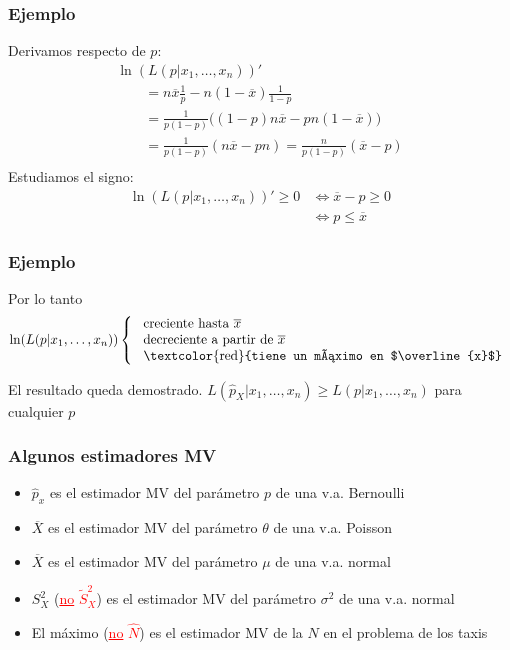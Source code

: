 \documentclass[12pt,t]{beamer}
\newcommand{\red}[1]{\textcolor{red}{#1}}
\renewcommand{\leq}{\leqslant}
\renewcommand{\geq}{\geqslant}
\theoremstyle{plain}
\theoremstyle{definition}
\begin{document}
\begin{frame}
\frametitle{Ejemplo}
Derivamos respecto de $p$:
$$
\begin{array}{l}
\ln(L(p|x_1,\ldots,x_n))'\\
\qquad \displaystyle=n\overline{x}\frac{1}{p}-n(1-\overline{x})\frac{1}{1-p}\\
\qquad \displaystyle=\frac{1}{p(1-p)}\Big((1-p)n\overline{x}-pn(1-\overline{x})\Big)\\
\qquad \displaystyle=\frac{1}{p(1-p)}(n\overline{x} -pn)=\frac{n}{p(1-p)}(\overline{x} -p)\\
\end{array}
$$
Estudiamos el signo:
$$
\begin{array}{rl}
\ln(L(p|x_1,\ldots,x_n))'\geq 0 &\displaystyle \Leftrightarrow \overline{x} -p\geq 0\\ &\displaystyle \Leftrightarrow
p\leq\overline{x}
\end{array}
$$
\end{frame}

\begin{frame}
\frametitle{Ejemplo}
Por lo tanto
$$
\ln(L(p|x_1,\ldots,x_n))\left\{
\begin{array}{l}
\mbox{ creciente hasta $\overline{x}$}\\
\mbox{ decreciente a partir de $\overline{x}$}\\
\mbox{ \red{tiene un máximo en $\overline{x}$}}
\end{array}\right.
$$

\vspace{1cm}

El resultado queda demostrado. $L(\widehat{p}_X|x_1,\ldots,x_n)\geq L(p|x_1,\ldots,x_n)$ para  cualquier  $p$
\end{frame}

\begin{frame}
\frametitle{Algunos estimadores MV}
\vspace*{-1ex}

\begin{itemize}
\item $\widehat{p}_x$ es el estimador MV del parámetro  $p$ de una v.a. Bernoulli
\medskip

\item $\overline{X}$  es el estimador MV del parámetro  $\theta$ de una v.a. Poisson
\medskip

\item $\overline{X}$  es el estimador MV del parámetro  $\mu$ de una v.a. normal
\medskip

\item $S_X^2$ (\red{\underline{no} $\widetilde{S}_X^2$}) es el estimador MV  del parámetro  $\sigma^2$ de una v.a. normal
\medskip

\item El máximo (\red{\underline{no}  $\widehat{N}$}) es el estimador MV de la $N$ en el  problema de los taxis

\end{itemize}

\end{frame}
\end{document}
